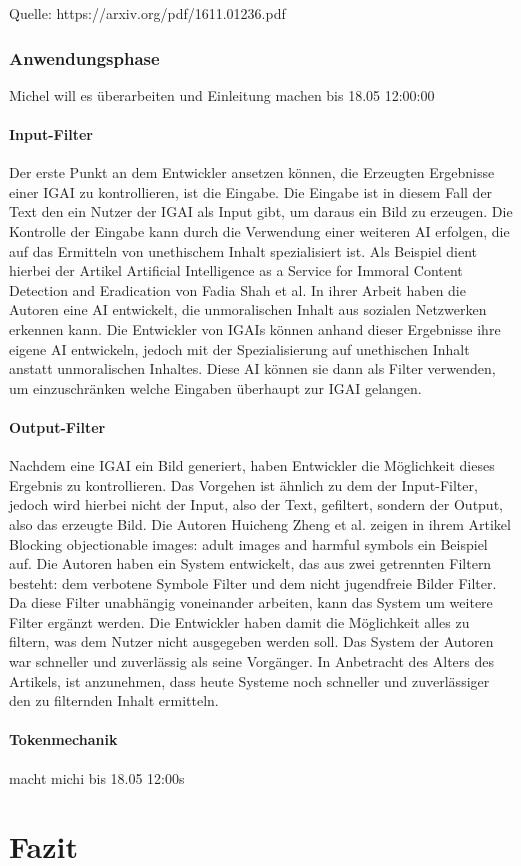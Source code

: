 \documentclass[12pt]{article}
\begin{document}
Quelle: https://arxiv.org/pdf/1611.01236.pdf

\subsection{Anwendungsphase}

Michel will es überarbeiten und Einleitung machen bis 18.05 12:00:00
\subsubsection{Input-Filter}
Der erste Punkt an dem Entwickler ansetzen können, die Erzeugten Ergebnisse einer IGAI zu kontrollieren, ist die Eingabe. Die Eingabe ist in diesem Fall der Text den ein Nutzer der IGAI als Input gibt, um daraus ein Bild zu erzeugen. Die Kontrolle der Eingabe kann durch die Verwendung einer weiteren AI erfolgen, die auf das Ermitteln von unethischem Inhalt spezialisiert ist. Als Beispiel dient hierbei der Artikel Artificial Intelligence as a Service for Immoral Content Detection and Eradication von Fadia Shah et al. In ihrer Arbeit haben die Autoren eine AI entwickelt, die unmoralischen Inhalt aus sozialen Netzwerken erkennen kann. Die Entwickler von IGAIs können anhand dieser Ergebnisse ihre eigene AI entwickeln, jedoch mit der Spezialisierung auf unethischen Inhalt anstatt unmoralischen Inhaltes. Diese AI können sie dann als Filter verwenden, um einzuschränken welche Eingaben überhaupt zur IGAI gelangen.

\subsubsection{Output-Filter}
Nachdem eine IGAI ein Bild generiert, haben Entwickler die Möglichkeit dieses Ergebnis zu kontrollieren. Das Vorgehen ist ähnlich zu dem der Input-Filter, jedoch wird hierbei nicht der Input, also der Text, gefiltert, sondern der Output, also das erzeugte Bild. Die Autoren Huicheng Zheng et al. zeigen in ihrem Artikel Blocking objectionable images: adult images and harmful symbols ein Beispiel auf. Die Autoren haben ein System entwickelt, das aus zwei getrennten Filtern besteht: dem verbotene Symbole Filter und dem nicht jugendfreie Bilder Filter. Da diese Filter unabhängig voneinander arbeiten, kann das System um weitere Filter ergänzt werden. Die Entwickler haben damit die Möglichkeit alles zu filtern, was dem Nutzer nicht ausgegeben werden soll. Das System der Autoren war schneller und zuverlässig als seine Vorgänger. In Anbetracht des Alters des Artikels, ist anzunehmen, dass heute Systeme noch schneller und zuverlässiger den zu filternden Inhalt ermitteln.
\subsubsection{Tokenmechanik}
macht michi bis 18.05 12:00s

\chapter{Fazit}


\end{document}
